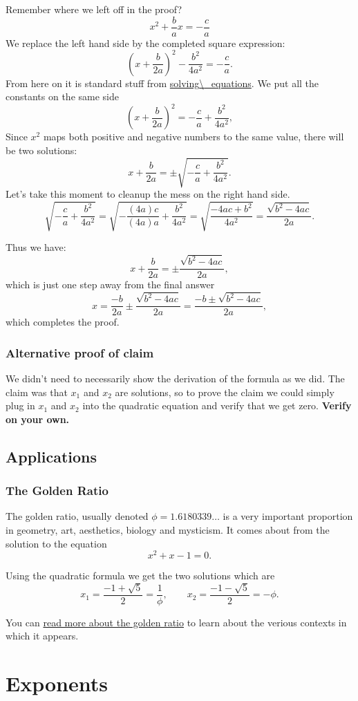 \documentclass[journal]{IEEEtran}
\newcommand{\dokutitleleveltwo}[1]{\section{#1}}
\newcommand{\dokutitleleveltree}[1]{\subsection{#1}}
\newcommand{\dokutitlelevelfour}[1]{\subsubsection{#1}}
\newcommand{\dokubold}[1]{\textbf{#1}}
\begin{document}
Remember where we left off in the proof?
\[
  x^2 + \frac{b}{a}x  = -\frac{c}{a}
\]
We replace the left hand side by the completed square expression:
\[
   \left(x + \frac{b}{2a} \right)^2 - \frac{b^2}{4a^2}  = -\frac{c}{a}.
\]
From here on it is standard stuff from \hyperref[de8b0e5156f4d2cb51a8bfd6e08459a0]{solving{\textbackslash}\_equations}.
We put all the constants on the same side
\[
   \left(x + \frac{b}{2a} \right)^2  = -\frac{c}{a} +  \frac{b^2}{4a^2}, 
\]
Since \(x^2\) maps both positive and negative numbers to the same value,
there will be two solutions:
\[
   x + \frac{b}{2a}  = \pm \sqrt{ -\frac{c}{a} +  \frac{b^2}{4a^2}  }.
\]
Let's take this moment to cleanup the mess on the right hand side.
\[
  \sqrt{ -\frac{c}{a} +  \frac{b^2}{4a^2}  } 
= \sqrt{ -\frac{(4a)c}{(4a)a} +  \frac{b^2}{4a^2}  }
= \sqrt{ \frac{- 4ac + b^2}{4a^2}  }
= \frac{\sqrt{b^2 -4ac}   }{ 2a   }.
\]

Thus we have:
\[
   x + \frac{b}{2a}  = \pm \frac{\sqrt{b^2 -4ac}   }{ 2a   },
\]
which is just one step away from the final answer
\[
   x  = \frac{-b}{2a}  \pm \frac{\sqrt{b^2 -4ac}   }{ 2a   } = \frac{-b \pm \sqrt{b^2 -4ac}   }{ 2a   },
\]
which completes the proof.


\dokutitlelevelfour{Alternative proof of claim}

We didn't need to necessarily show the derivation of the formula
as we did.  The claim was that \(x_1\) and \(x_2\) are solutions,
so to prove the claim we could simply plug in \(x_1\)
and \(x_2\) into the quadratic equation and verify that we get zero.
\dokubold{Verify on your own.}


\dokutitleleveltree{Applications}
\label{b5fba9ff24d0045d1377a05a46b32f68}%

\dokutitlelevelfour{The Golden Ratio}

The golden ratio, usually denoted \(\phi=1.6180339\ldots\)
is a very important  proportion in geometry, art, aesthetics, biology and mysticism. 
It comes about from the solution to the equation
\[
  x^2 +x -1 = 0.
\]

Using the quadratic formula we get the two solutions
which are
\[
   x_1 = \frac{-1+\sqrt{5}}{2} = \frac{1}{\phi}, \qquad x_2 = \frac{-1-\sqrt{5}}{2} = - \phi.
\]

You can \hyperref[d7bbf6d9d4bc796ac89630339c203241]{read more about the golden ratio} to learn
about the verious contexts in which it appears.




\dokutitleleveltwo{Exponents}
\label{2f711bc1acfc4fcc18827d8a2655a05f}%
\end{document}
